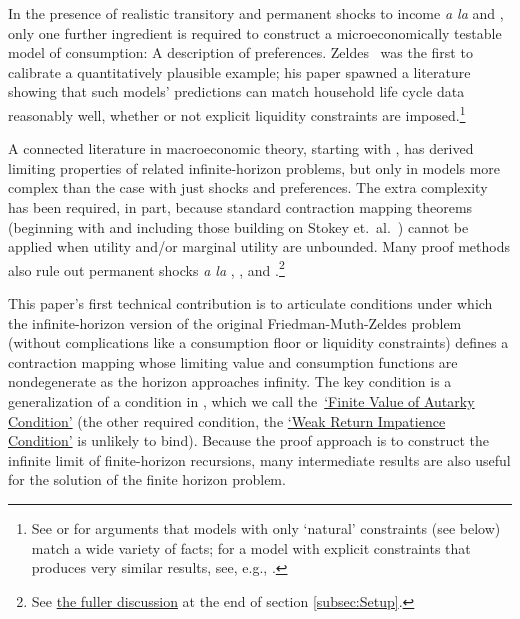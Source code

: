 \documentclass[BufferStockTheory]{subfiles}
\begin{document}
\label{sec:intro}

In the presence of realistic transitory and permanent shocks to income \textit{a la} \cite{friedmanATheory} and \cite{muthOptimal}, only one further ingredient is required to construct a microeconomically testable model of consumption: A description of preferences.  Zeldes~\citeyearpar{zeldesStochastic} was the first to calibrate a quantitatively plausible example; his paper spawned a literature showing that such models' predictions can match household life cycle data reasonably well, whether or not explicit liquidity constraints are imposed.\footnote{See \cite{carrollBSLCPIH} or \cite{gpLifeCycle} for arguments that models with only `natural' constraints (see below) match a wide variety of facts; for a model with explicit constraints that produces very similar results, see, e.g., \cite{Cagetti}.}

A connected literature in macroeconomic theory, starting with \cite{bewleyPIH}, has derived limiting properties of related infinite-horizon problems, but only in models more complex than the case with just shocks and preferences.  The extra complexity has been required, in part, because standard contraction mapping theorems (beginning with \cite{bellmanDynamicProgramming} and including those building on Stokey et.~al.~\citeyearpar{slpMethods}) cannot be applied when utility and/or marginal utility are unbounded.  Many proof methods also rule out permanent shocks \textit{a la} \cite{friedmanATheory}, \cite{muthOptimal}, and \cite{zeldesStochastic}.\footnote{See \hyperlink{DiffFromLit}{the fuller discussion} at the end of section \ref{subsec:Setup}.}

This paper's first technical contribution is to articulate conditions under which the infinite-horizon version of the original Friedman-Muth-Zeldes problem (without complications like a consumption floor or liquidity constraints) defines a contraction mapping whose limiting value and consumption functions are nondegenerate as the horizon approaches infinity.  The key condition is a generalization of a condition in \cite{mstIncFluct}, which we call the~\hyperlink{FVAC}{`Finite Value of Autarky Condition'} (the other required condition, the \hyperlink{WRIC}{`Weak Return Impatience Condition'} is unlikely to bind).  Because the proof approach is to construct the infinite limit of finite-horizon recursions, many intermediate results are also useful for the solution of the finite horizon problem.  %
\end{document}
